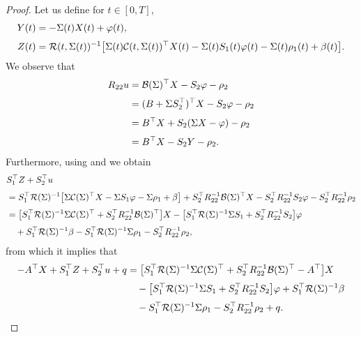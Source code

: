 \documentclass[11pt,times,twoside]{article}
\begin{document}
\begin{proof}
%
Let us define for $t\in[0,T]$,
%
\begin{align}
\ds    Y(t) &= -\Si(t)X(t)+\f(t), \label{4.6}\\
\ns\ds Z(t) &=\cR(t,\Si(t))^{-1}\big[\Si(t)\cC(t,\Si(t))^{\top} X(t)-\Si(t) S_{1}(t)\varphi(t) -\Si(t)\rho_1(t) +\beta(t)\big].  \label{4.7}
\end{align}
%
We observe that
%
\begin{align}
\ds R_{22}u &= \mathcal{B}(\Si)^{\top} X-S_{2} \varphi -\rho_2 \nonumber\\
\ns\ds &= (B+\Si S_{2}^{\top})^\top X-S_{2} \varphi -\rho_2 \nonumber\\
\ns\ds &= B^{\top} X +S_{2}(\Si X- \varphi) -\rho_2 \nonumber\\
\ns\ds &= B^{\top} X -S_{2}Y -\rho_2. \label{4.8}
\end{align}
%
Furthermore, using  and  we obtain
%
\begin{align*}
\ds &S_{1}^{\top} Z+S_{2}^{\top} u\\
\ns\ds &= S_{1}^{\top} \mathcal{R}(\Si)^{-1}\big[\Si\mathcal{C}(\Si)^{\top} X-\Si S_{1} \varphi -\Si\rho_1 +\beta\big]
+S_{2}^{\top} R_{22}^{-1} \mathcal{B}(\Si)^{\top} X
-S_{2}^{\top} R_{22}^{-1} S_{2} \varphi-S_{2}^{\top} R_{22}^{-1}\rho_2 \\
%
\ns\ds &=\big[S_{1}^{\top} \mathcal{R}(\Si)^{-1} \Si \mathcal{C}(\Si)^{\top}+S_{2}^{\top} R_{22}^{-1} \mathcal{B}(\Si)^{\top}\big] X
-\big[S_{1}^{\top} \mathcal{R}(\Si)^{-1} \Si S_{1}+S_{2}^{\top} R_{22}^{-1} S_{2}\big]\varphi\\
%
\ns\ds &\q +S_{1}^{\top} \mathcal{R}(\Si)^{-1} \beta-S_{1}^{\top} \mathcal{R}(\Si)^{-1} \Si\rho_1-S_{2}^{\top} R_{22}^{-1}\rho_2,
\end{align*}
%
from which it implies that
%
\begin{equation}\label{4.0}\begin{aligned}
-A^\top X+S_{1}^{\top} Z+S_{2}^{\top} u +q
%
&=\big[S_{1}^{\top} \mathcal{R}(\Si)^{-1} \Si \mathcal{C}(\Si)^{\top}+S_{2}^{\top} R_{22}^{-1} \mathcal{B}(\Si)^{\top}-A^\top\big] X \\
%
\ns\ds &\q -\big[S_{1}^{\top} \mathcal{R}(\Si)^{-1} \Si S_{1}+S_{2}^{\top} R_{22}^{-1} S_{2}\big] \varphi
+S_{1}^{\top} \mathcal{R}(\Si)^{-1} \beta\\
%
\ns\ds &\q -S_{1}^{\top} \mathcal{R}(\Si)^{-1} \Si\rho_1
-S_{2}^{\top} R_{22}^{-1}\rho_2+q.
%
\end{aligned}\end{equation}

\end{proof}
\end{document}

